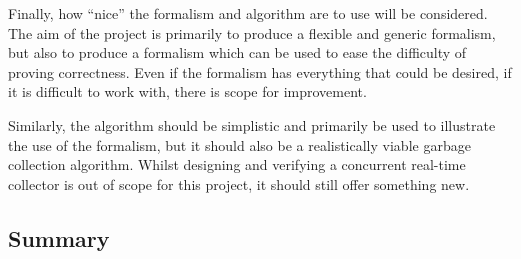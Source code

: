 Finally, how ``nice'' the formalism and algorithm are to use will be
considered. The aim of the project is primarily to produce a flexible
and generic formalism, but also to produce a formalism which can be
used to ease the difficulty of proving correctness. Even if the
formalism has everything that could be desired, if it is difficult to
work with, there is scope for improvement.

Similarly, the algorithm should be simplistic and primarily be used to
illustrate the use of the formalism, but it should also be a
realistically viable garbage collection algorithm. Whilst designing
and verifying a concurrent real-time collector is out of scope for
this project, it should still offer something new.

\subsection{Summary}
\label{sec:analysis-summary}

